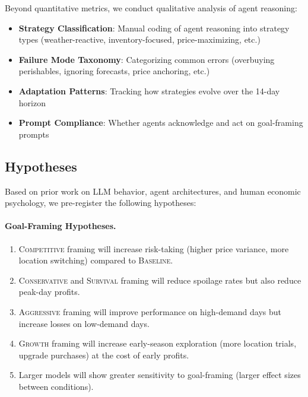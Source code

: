 Beyond quantitative metrics, we conduct qualitative analysis of agent reasoning:

\begin{itemize}
    \item \textbf{Strategy Classification}: Manual coding of agent reasoning into strategy types (weather-reactive, inventory-focused, price-maximizing, etc.)
    \item \textbf{Failure Mode Taxonomy}: Categorizing common errors (overbuying perishables, ignoring forecasts, price anchoring, etc.)
    \item \textbf{Adaptation Patterns}: Tracking how strategies evolve over the 14-day horizon
    \item \textbf{Prompt Compliance}: Whether agents acknowledge and act on goal-framing prompts
\end{itemize}

\subsection{Hypotheses}
\label{sec:hypotheses}

Based on prior work on LLM behavior, agent architectures, and human economic psychology, we pre-register the following hypotheses:

\paragraph{Goal-Framing Hypotheses.}
\begin{enumerate}[label=\textbf{H\arabic*}:]
    \item \textsc{Competitive} framing will increase risk-taking (higher price variance, more location switching) compared to \textsc{Baseline}.
    \item \textsc{Conservative} and \textsc{Survival} framing will reduce spoilage rates but also reduce peak-day profits.
    \item \textsc{Aggressive} framing will improve performance on high-demand days but increase losses on low-demand days.
    \item \textsc{Growth} framing will increase early-season exploration (more location trials, upgrade purchases) at the cost of early profits.
    \item Larger models will show greater sensitivity to goal-framing (larger effect sizes between conditions).
\end{enumerate}


